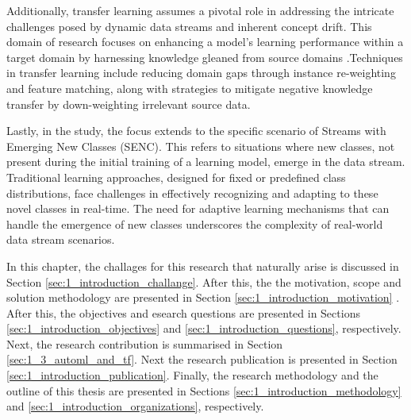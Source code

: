 Additionally, transfer learning assumes a pivotal role in addressing the intricate challenges posed by dynamic data streams and inherent concept drift. This domain of research focuses on enhancing a model's learning performance within a target domain by harnessing knowledge gleaned from source domains \cite{pan2009survey} \cite{wang2018systematic}.Techniques in transfer learning include reducing domain gaps through instance re-weighting and feature matching, along with strategies to mitigate negative knowledge transfer by down-weighting irrelevant source data.

Lastly, in the study, the focus extends to the specific scenario of Streams with Emerging New Classes (SENC). This refers to situations where new classes, not present during the initial training of a learning model, emerge in the data stream. Traditional learning approaches, designed for fixed or predefined class distributions, face challenges in effectively recognizing and adapting to these novel classes in real-time. The need for adaptive learning mechanisms that can handle the emergence of new classes underscores the complexity of real-world data stream scenarios.
     

In this chapter, the challages for this research 
that naturally arise is discussed in  Section \ref{sec:1_introduction_challange}. After this, the the motivation, scope and solution methodology are presented in Section \ref{sec:1_introduction_motivation} . After this, the objectives and
esearch questions are presented in Sections \ref{sec:1_introduction_objectives} and \ref{sec:1_introduction_questions}, respectively. Next, the
research contribution is summarised in Section \ref{sec:1_3_automl_and_tf}. Next the research publication is presented in Section \ref{sec:1_introduction_publication}. Finally,
the research methodology and the outline of this thesis are presented in Sections \ref{sec:1_introduction_methodology} and
\ref{sec:1_introduction_organizations}, respectively.